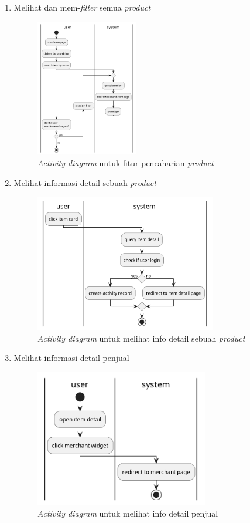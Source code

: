 \documentclass[a4paper]{article}
\begin{document}
\begin{enumerate}
\begin{enumerate}
        \item Melihat dan mem-\textit{filter} semua \textit{product}
        \begin{figure}[h]
            \centering
            \includegraphics*[height=6cm]{./diagram/activity diagram/9. search item/search item.png}
            \caption{\textit{Activity diagram} untuk fitur pencaharian \textit{product}}
        \end{figure}
        \item Melihat informasi detail sebuah \textit{product}
        \begin{figure}[h]
            \centering
            \includegraphics*[height=6cm]{./diagram/activity diagram/10. see item detail/see item detail.png}
            \caption{\textit{Activity diagram} untuk melihat info detail sebuah \textit{product}}
        \end{figure}
        \newpage

        \item Melihat informasi detail penjual
        \begin{figure}[h]
            \centering
            \includegraphics*[height=6cm]{./diagram/activity diagram/11. view merchant page/view merchant page.png}
            \caption{\textit{Activity diagram} untuk melihat info detail penjual}
        \end{figure}


\end{enumerate}
\end{enumerate}
\end{document}
